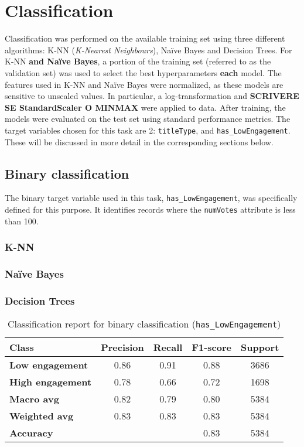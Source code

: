 
\chapter{Classification}
\label{ch:capitolo3}
Classification was performed on the available training set using three different algorithms: K-NN (\textit{K-Nearest Neighbours}), Naïve Bayes and Decision Trees.
For K-NN \textbf{and Naïve Bayes}, a portion of the training set (referred to as the validation set) was used to select the best hyperparameters \textbf{each} model.
The features used in K-NN and Naïve Bayes were normalized, as these models are sensitive to unscaled values.
In particular, a log-transformation and \textbf{SCRIVERE SE StandardScaler O MINMAX} were applied to data.
After training, the models were evaluated on the test set using standard performance metrics. 
The target variables chosen for this task are 2: \texttt{titleType}, and \texttt{has\_LowEngagement}.
These will be discussed in more detail in the corresponding sections below.

\section{Binary classification}\label{sec:binary_classification}
The binary target variable used in this task, \texttt{has\_LowEngagement}, was specifically defined for this purpose. 
It identifies records where the \texttt{numVotes} attribute is less than 100.
\subsection*{K-NN}
\subsection*{Naïve Bayes}
\subsection*{Decision Trees}
\begin{table}[h!]
    \centering
    \caption{Classification report for binary classification (\texttt{has\_LowEngagement})}
    \begin{tabular}{lcccc}
        \toprule
        \bf{Class} & \bf{Precision} & \bf{Recall} & \bf{F1-score} & \bf{Support} \\
        \midrule
        \bf{Low engagement} & 0.86 & 0.91 & 0.88 & 3686 \\
        \bf{High engagement} & 0.78 & 0.66 & 0.72 & 1698 \\
        \midrule
        \bf{Macro avg} & 0.82 & 0.79 & 0.80 & 5384 \\
        \bf{Weighted avg} & 0.83 & 0.83 & 0.83 & 5384 \\
        \midrule
        \bf{Accuracy}  &  &  & 0.83 & 5384 \\
        \bottomrule
    \end{tabular}
    \label{tab:binary_classification_report}
\end{table}


